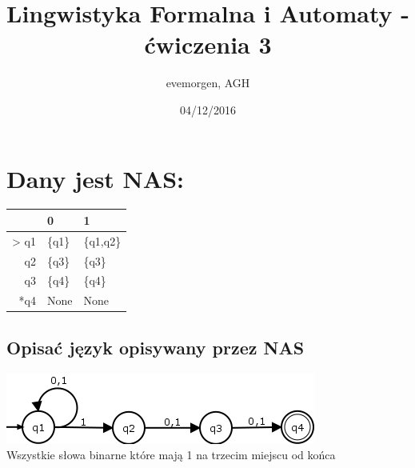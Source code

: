 \documentclass[a4paper,11pt]{article}
\begin{document}
\title{Lingwistyka Formalna i Automaty - ćwiczenia 3}
\author{evemorgen, AGH}
\date{04/12/2016}
\maketitle

\newpage
\section{Dany jest NAS:}
\begin{center}
	\begin{tabular}{rcc}
		\hline
		\multicolumn{1}{|r|}{}     & \multicolumn{1}{l|}{0}      & \multicolumn{1}{l|}{1}         \\ \hline
		\multicolumn{1}{|r|}{> q1} & \multicolumn{1}{l|}{\{q1\}} & \multicolumn{1}{l|}{\{q1,q2\}} \\ \hline
		\multicolumn{1}{|r|}{q2}   & \multicolumn{1}{l|}{\{q3\}} & \multicolumn{1}{l|}{\{q3\}}    \\ \hline
		\multicolumn{1}{|r|}{q3}   & \multicolumn{1}{l|}{\{q4\}} & \multicolumn{1}{l|}{\{q4\}}    \\ \hline
		\multicolumn{1}{|r|}{*q4}  & \multicolumn{1}{l|}{None}   & \multicolumn{1}{l|}{None}      \\ \hline
	\end{tabular}
\end{center}
\subsection{Opisać język opisywany przez NAS}
\begin{center}
	\includegraphics{nas1} \\
	Wszystkie słowa binarne które mają 1 na trzecim miejscu od końca
\end{center}
\end{document}
